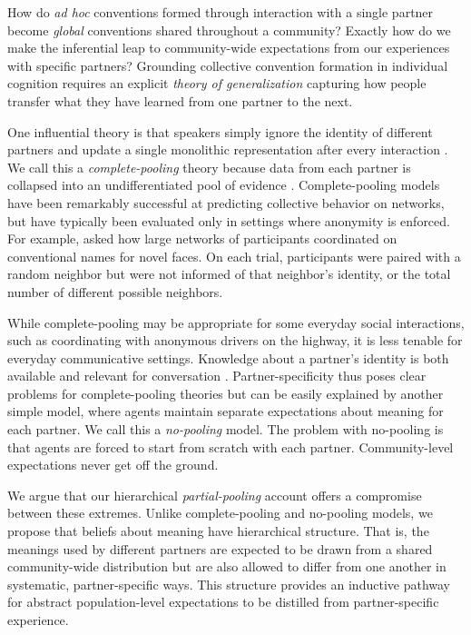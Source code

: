 
How do \emph{ad hoc} conventions formed through interaction with a single partner become \emph{global} conventions shared throughout a community?
Exactly how do we make the inferential leap to community-wide expectations from our experiences with specific partners? 
Grounding collective convention formation in individual cognition requires an explicit \emph{theory of generalization} capturing how people transfer what they have learned from one partner to the next.

One influential theory is that speakers simply ignore the identity of different partners and update a single monolithic representation after every interaction \cite{steels_self-organizing_1995,barr_establishing_2004,young_evolution_2015}.
We call this a \emph{complete-pooling} theory because data from each partner is collapsed into an undifferentiated pool of evidence \cite{gelman2006data}. 
Complete-pooling models have been remarkably successful at predicting collective behavior on networks, but have typically been evaluated only in settings where anonymity is enforced. 
For example,  asked how large networks of participants coordinated on conventional names for novel faces.
On each trial, participants were paired with a random neighbor but were not informed of that neighbor's identity, or the total number of different possible neighbors. 

While complete-pooling may be appropriate for some everyday social interactions, such as coordinating with anonymous drivers on the highway, it is less tenable for everyday communicative settings.
Knowledge about a partner's identity is both available and relevant for conversation \cite{eckert_three_2012, davidson_nice_1986}.
Partner-specificity thus poses clear problems for complete-pooling theories but can be easily explained by another simple model, where agents maintain separate expectations about meaning for each partner.
We call this a \emph{no-pooling} model.
The problem with no-pooling is that agents are forced to start from scratch with each partner.
Community-level expectations never get off the ground.

We argue that our hierarchical \emph{partial-pooling} account offers a compromise between these extremes.
Unlike complete-pooling and no-pooling models, we propose that beliefs about meaning have hierarchical structure.
That is, the meanings used by different partners are expected to be drawn from a shared community-wide distribution but are also allowed to differ from one another in systematic, partner-specific ways.
This structure provides an inductive pathway for abstract population-level expectations to be distilled from partner-specific experience.

